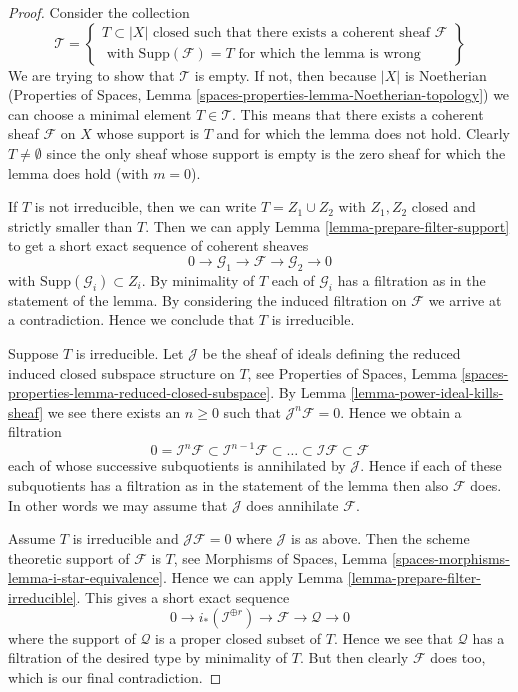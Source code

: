 \begin{proof}
Consider the collection
$$
\mathcal{T} =
\left\{
\begin{matrix}
T \subset |X|
\text{ closed such that there exists a coherent sheaf }
\mathcal{F} \\
\text{ with }
\text{Supp}(\mathcal{F}) = T
\text{ for which the lemma is wrong}
\end{matrix}
\right\}
$$
We are trying to show that $\mathcal{T}$ is empty. If not, then
because $|X|$ is Noetherian (Properties of Spaces, Lemma
\ref{spaces-properties-lemma-Noetherian-topology})
we can choose a minimal element $T \in \mathcal{T}$. This means that
there exists a coherent sheaf $\mathcal{F}$ on $X$ whose support is $T$
and for which the lemma does not hold. Clearly $T \not = \emptyset$ since
the only sheaf whose support is empty is the zero sheaf for which the
lemma does hold (with $m = 0$).

\medskip\noindent
If $T$ is not irreducible, then we can write $T = Z_1 \cup Z_2$
with $Z_1, Z_2$ closed and strictly smaller than $T$.
Then we can apply Lemma \ref{lemma-prepare-filter-support}
to get a short exact sequence of coherent sheaves
$$
0 \to
\mathcal{G}_1 \to
\mathcal{F} \to
\mathcal{G}_2 \to 0
$$
with $\text{Supp}(\mathcal{G}_i) \subset Z_i$. By minimality of
$T$ each of $\mathcal{G}_i$ has a filtration as in the statement
of the lemma. By considering the induced filtration on $\mathcal{F}$
we arrive at a contradiction. Hence we conclude
that $T$ is irreducible.

\medskip\noindent
Suppose $T$ is irreducible. Let $\mathcal{J}$ be the sheaf of ideals
defining the reduced induced closed subspace structure on $T$,
see Properties of Spaces, Lemma
\ref{spaces-properties-lemma-reduced-closed-subspace}.
By Lemma \ref{lemma-power-ideal-kills-sheaf} we see there exists
an $n \geq 0$ such that $\mathcal{J}^n\mathcal{F} = 0$. Hence we obtain
a filtration
$$
0 = \mathcal{I}^n\mathcal{F} \subset \mathcal{I}^{n - 1}\mathcal{F}
\subset \ldots \subset \mathcal{I}\mathcal{F} \subset \mathcal{F}
$$
each of whose successive subquotients is annihilated by $\mathcal{J}$.
Hence if each of these subquotients has a filtration as in the statement
of the lemma then also $\mathcal{F}$ does. In other words we may
assume that $\mathcal{J}$ does annihilate $\mathcal{F}$.

\medskip\noindent
Assume $T$ is irreducible and $\mathcal{J}\mathcal{F} = 0$ where
$\mathcal{J}$ is as above. Then the scheme theoretic support of
$\mathcal{F}$ is $T$, see
Morphisms of Spaces, Lemma \ref{spaces-morphisms-lemma-i-star-equivalence}.
Hence we can apply Lemma \ref{lemma-prepare-filter-irreducible}.
This gives a short exact sequence
$$
0 \to
i_*(\mathcal{I}^{\oplus r}) \to
\mathcal{F} \to
\mathcal{Q} \to 0
$$
where the support of $\mathcal{Q}$ is a proper closed subset of $T$.
Hence we see that $\mathcal{Q}$ has a filtration of the desired type
by minimality of $T$. But then clearly $\mathcal{F}$ does too, which is
our final contradiction.
\end{proof}

